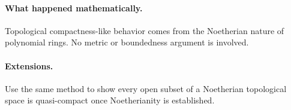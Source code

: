 \paragraph{What happened mathematically.}
Topological compactness-like behavior comes from the Noetherian nature of polynomial rings.
No metric or boundedness argument is involved.

\paragraph{Extensions.}
Use the same method to show every open subset of a Noetherian topological space is
quasi-compact once Noetherianity is established.
\fi
